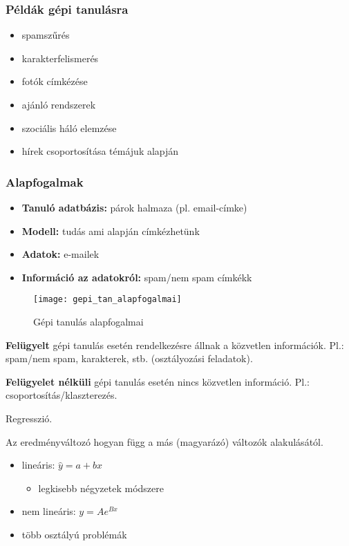 \subsubsection{Példák gépi tanulásra}

\begin{itemize}
    \item spamszűrés
    \item karakterfelismerés
    \item fotók címkézése
    \item ajánló rendszerek
    \item szociális háló elemzése
    \item hírek csoportosítása témájuk alapján
\end{itemize}

\subsubsection{Alapfogalmak}

\begin{itemize}
    \item {\bf Tanuló adatbázis:} párok halmaza (pl. email-címke)
    \item {\bf Modell:} tudás ami alapján címkézhetünk
    \item {\bf Adatok:} e-mailek
    \item {\bf Információ az adatokról:} spam/nem spam címkékk
\end{itemize}

\begin{figure}[H]
    \centering
    \texttt{[image: gepi\_tan\_alapfogalmai]}
    \caption{Gépi tanulás alapfogalmai}
    \label{fig:gepi_tan_alapfogalmai}
\end{figure}

{\bf Felügyelt} gépi tanulás esetén rendelkezésre állnak a közvetlen
információk. Pl.: spam/nem spam, karakterek, stb. (osztályozási feladatok).

{\bf Felügyelet nélküli} gépi tanulás esetén nincs közvetlen információ. Pl.:
csoportosítás/klaszterezés.

\begin{definicio}
    Regresszió.

    Az eredményváltozó hogyan függ a más (magyarázó) változók alakulásától.
    \begin{itemize}
        \item lineáris: $\hat{y} = a + bx$
            \begin{itemize}
                \item legkisebb négyzetek módszere
            \end{itemize}
        \item nem lineáris: $y = Ae^{Bx}$
        \item több osztályú problémák
    \end{itemize}
\end{definicio}

